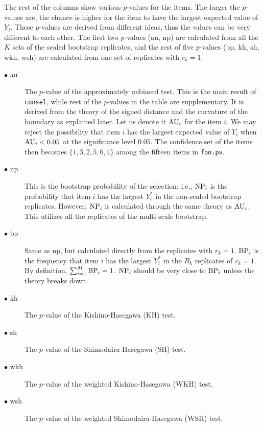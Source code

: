 \documentclass[12pt]{article}
\begin{document}
The rest of the columns show various $p$-values for the items.  The
larger the $p$-values are, the chance is higher for the item to have the
largest expected value of $Y_i$. These $p$-values are derived from
different ideas, thus the values can be very different to each other.
The first two $p$-values (au, np) are calculated from all the $K$ sets
of the scaled bootstrap replicates, and the rest of five $p$-values
(bp, kh, sh, wkh, wsh) are calculated from one set of replicates with
$r_k=1$.
\begin{description}
 \item[$\bullet$ au] The $p$-value of the approximately unbiased
	    test. This is the main result of {\tt consel}, while rest of
	    the $p$-values in the table are supplementary.  It is
	    derived from the theory of the signed distance and the
	    curvature of the boundary as explained later.  Let us denote
	    it ${\rm AU}_i$ for the item $i$. We may reject the
	    possibility that item $i$ has the largest expected value of
	    $Y_i$ when ${\rm AU}_i < 0.05$ at the significance level
	    0.05. The confidence set of the items then becomes $\{1,3,2,
	    5,6,4 \}$ among the fifteen items in {\tt foo.pv}.
 \item[$\bullet$ np] This is the bootstrap probability of the selection;
	    i.e., ${\rm NP}_i$ is the probability that item $i$ has the
	    largest $Y^*_i$ in the non-scaled bootstrap replicates.
	    However, ${\rm NP}_i$ is calculated through the same theory
	    as ${\rm AU}_i$.  This utilizes all the replicates of the
	    multi-scale bootstrap.
 \item[$\bullet$ bp] Same as np, but calculated directly from the
	    replicates with $r_k=1$. ${\rm BP}_i$ is the frequency
	    that item $i$ has the largest $Y^*_i$ in the $B_k$
	    replicates of $r_k=1$. By definition, $\sum_{i=1}^M
	    {\rm BP}_i = 1$. ${\rm NP}_i $ should be very close to
	    ${\rm BP}_i$ unless the theory breaks down.
 \item[$\bullet$ kh] The $p$-value of the Kishino-Hasegawa (KH) test.
 \item[$\bullet$ sh] The $p$-value of the Shimodaira-Hasegawa (SH) test.
 \item[$\bullet$ wkh] The $p$-value of the weighted Kishino-Hasegawa
	    (WKH) test.
 \item[$\bullet$ wsh] The $p$-value of the weighted Shimodaira-Hasegawa
	    (WSH) test.
\end{description}
\end{document}
